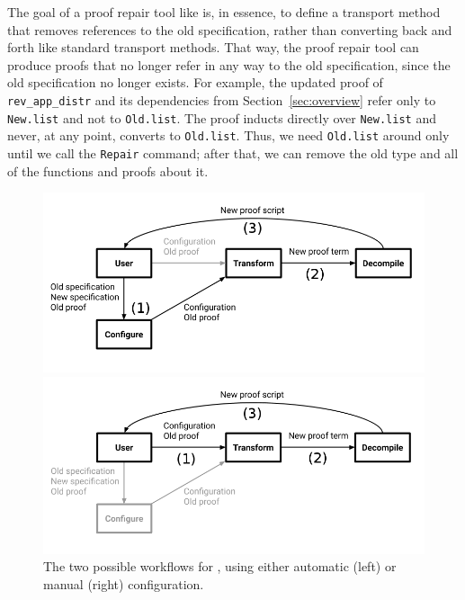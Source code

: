 The goal of a proof repair tool like \toolname is, in essence, to define a transport method that
removes references to the old specification, rather than converting back and forth like standard transport methods.
That way, the proof repair tool can produce proofs that no longer refer in any way to the old specification,
since the old specification no longer exists.
For example, the updated proof of \lstinline{rev_app_distr} and its dependencies
from Section~\ref{sec:overview} refer only to \lstinline{New.list} and not to \lstinline{Old.list}.
The proof inducts directly over \lstinline{New.list} and never, at any point, converts to \lstinline{Old.list}.
Thus, we need \lstinline{Old.list} around only until we call the \lstinline{Repair} command;
after that, we can remove the old type and all of the functions and proofs about it. %

\begin{figure}
\begin{minipage}{0.49\textwidth}
\includegraphics[width=\linewidth]{workflowa.png}
\end{minipage}
\hfill
\begin{minipage}{0.49\textwidth}
\includegraphics[width=\linewidth]{workflowb.png}
\end{minipage}
\vspace{-0.2cm}
\caption{The two possible workflows for \toolname, using either automatic (left) or manual (right) configuration.}
\label{fig:system}
\end{figure}

